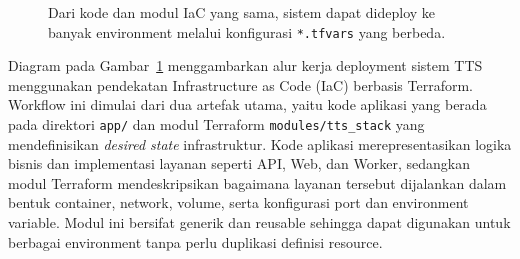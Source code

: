 \begin{figure}[h]
{%
}
\caption{Dari kode dan modul IaC yang sama, sistem dapat dideploy ke banyak environment melalui konfigurasi \texttt{*.tfvars} yang berbeda.}
\label{fig:workflow_terraform}
\end{figure}

Diagram pada Gambar~\ref{fig:workflow_terraform} menggambarkan alur kerja deployment sistem TTS menggunakan pendekatan Infrastructure as Code (IaC) berbasis Terraform. Workflow ini dimulai dari dua artefak utama, yaitu kode aplikasi yang berada pada direktori \texttt{app/} dan modul Terraform \texttt{modules/tts\_stack} yang mendefinisikan \textit{desired state} infrastruktur. Kode aplikasi merepresentasikan logika bisnis dan implementasi layanan seperti API, Web, dan Worker, sedangkan modul Terraform mendeskripsikan bagaimana layanan tersebut dijalankan dalam bentuk container, network, volume, serta konfigurasi port dan environment variable. Modul ini bersifat generik dan reusable sehingga dapat digunakan untuk berbagai environment tanpa perlu duplikasi definisi resource.

